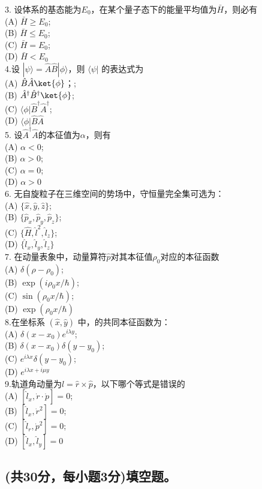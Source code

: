 3. 设体系的基态能为$E_0$，在某个量子态下的能量平均值为$\bar{H} $，则必有\\
   (A) $\bar{H} \geq E_0$; \\
   (B) $\bar{H} \leq E_0$; \\
   (C) $\bar{H} = E_0$; \\
   (D) $\bar{H}< E_0$\\

4.设 $|\psi\rangle = \hat{A}\hat{B}|\phi\rangle$，则 $\langle \psi |$ 的表达式为\\
   (A) $\hat{B} \hat{A}\ket{\phi}$；; \\
   (B) $ \hat{A}^\dagger \hat{B}^\dagger \ket{\phi}$; \\
   (C) $\langle \phi | \hat{B}^{\dagger} \hat{A}^{\dagger}$; \\
   (D)  $\langle \phi | \hat{B} \hat{A}$\\

5. 设$\hat{A}^\dagger \hat{A}$的本征值为$\alpha$，则有\\
   (A) $\alpha<0$; \\
   (B) $\alpha>0$; \\
   (C) $\alpha=0$; \\
   (D) $\alpha>0$\\

6. 无自旋粒子在三维空间的势场中，守恒量完全集可选为：\\
   (A) $\{\hat{x}, \hat{y}, \hat{z}\}$; \\
   (B)  $\{\hat{p}_x, \hat{p}_y,\hat{p}_z\}$; \\
   (C) $\{\hat{H},\hat{l}^2,  \hat{l}_z\}$; \\
   (D) $\{\hat{l}_x, \hat{l}_y,\hat{l}_z\}$\\

7. 在动量表象中，动量算符$\hat{p}$对其本征值$\rho_0$对应的本征函数\\
   (A) $\delta(\rho-\rho_0)$; \\
   (B) $\exp(i\rho_0 x/\hbar)$; \\
   (C) $\sin(\rho_0 x/\hbar)$; \\
   (D) $\exp(\rho_0 x/\hbar)$\\

8.在坐标系 $(\hat{x}, \hat{y})$ 中，的共同本征函数为：\\
   (A) $\delta(x-x_0)e^{i\lambda y}$; \\
   (B) $\delta(x-x_0)\delta(y-y_0)$; \\
   (C) $e^{i\lambda x} \delta(y-y_0)$; \\
   (D) $e^{i\lambda x + i\mu y}$\\

9.轨道角动量为$\hat{l}=\hat{r}\times \hat{p}$，以下哪个等式是错误的\\
   (A) $[\hat{l}_x, \dot{r} \cdot \dot{p}] = 0$; \\
   (B) $[\hat{l}_x, \dot{r}^2] = 0$; \\
   (C) $[\hat{l}_r, \dot{p}^2] = 0$; \\
   (D) $[\hat{l}_x, \hat{l}_y] = 0$\\

\subsection{(共30分，每小题3分)填空题。}

